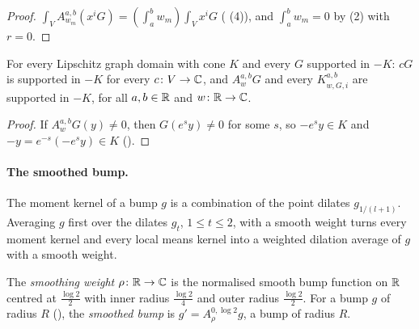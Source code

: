 \begin{proof}
\leanok
$\int_V A^{a,b}_{w_m}(x^i G) = (\int_a^b w_m) \int_V x^i G$ ( (4)),
and $\int_a^b w_m = 0$ by  (2) with $r = 0$.
\end{proof}

\begin{lemma}
\label{lem:higher-divergence-cone}
\leanok
{}
For every Lipschitz graph domain with cone $K$ and every $G$ supported in $-K$: $c G$ is
supported in $-K$ for every $c \colon V \to \mathbb{C}$, and $A^{a,b}_w G$ and every
$K^{a,b}_{w,G,i}$ are supported in $-K$, for all $a, b \in \mathbb{R}$ and $w \colon \mathbb{R} \to \mathbb{C}$.
\end{lemma}

\begin{proof}
\leanok
If $A^{a,b}_w G(y) \neq 0$, then $G(e^s y) \neq 0$ for some $s$, so $-e^s y \in K$ and
$-y = e^{-s}(-e^s y) \in K$ ().
\end{proof}

\paragraph{The smoothed bump.}

The moment kernel of a bump $g$ is a combination of the point dilates $g_{1/(l+1)}$. Averaging
$g$ first over the dilates $g_t$, $1 \leq t \leq 2$, with a smooth weight turns every moment kernel
and every local means kernel into a weighted dilation average of $g$ with a smooth weight.

\begin{definition}
\label{def:smoothed-bump}
\leanok
{}
The \emph{smoothing weight} $\rho \colon \mathbb{R} \to \mathbb{C}$ is the normalised smooth bump function on
$\mathbb{R}$ centred at $\frac{\log 2}{2}$ with inner radius $\frac{\log 2}{4}$ and outer radius
$\frac{\log 2}{2}$. For a bump $g$ of radius
$R$ (), the \emph{smoothed bump} is $g' = A^{0, \log 2}_\rho g$, a bump of
radius $R$.
\end{definition}

